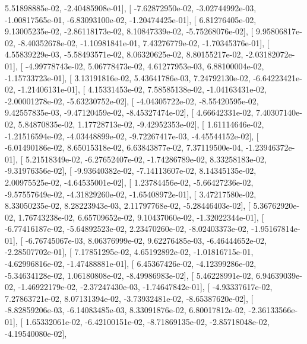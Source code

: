 \documentclass{article}
\begin{document}
          5.51898885e-02,  -2.40485908e-01],
       [ -7.62872950e-02,  -3.02744992e-03,  -1.00817565e-01,
         -6.83093100e-02,  -1.20474425e-01],
       [  6.81276405e-02,   9.13005235e-02,  -2.86118173e-02,
          8.10847339e-02,  -5.75268076e-02],
       [  9.95806817e-02,  -8.40352678e-02,  -1.10981841e-01,
          7.43276779e-02,  -1.70345376e-01],
       [  4.55839229e-03,  -5.58493571e-02,   8.06320625e-02,
          8.80155217e-02,  -2.03182072e-01],
       [ -4.99778743e-02,   5.06778473e-02,   4.61277953e-03,
          6.88100004e-02,  -1.15733723e-01],
       [  3.13191816e-02,   5.43641786e-03,   7.24792130e-02,
         -6.64223421e-02,  -1.21406131e-01],
       [  4.15331453e-02,   7.58585138e-02,  -1.04163431e-02,
         -2.00001278e-02,  -5.63230752e-02],
       [ -4.04305722e-02,  -8.55420595e-02,   9.42557835e-03,
         -9.47120459e-02,  -8.45327474e-02],
       [  4.66642331e-02,   7.40307140e-02,   5.84870835e-02,
          1.17728713e-02,  -9.42952353e-02],
       [  1.61114646e-02,  -1.21516594e-02,  -4.03448899e-02,
         -9.72267417e-03,  -4.45544152e-02],
       [ -6.01490186e-02,   8.65015318e-02,   6.63843877e-02,
          7.37119500e-04,  -1.23946372e-01],
       [  5.21518349e-02,  -6.27652407e-02,  -1.74286789e-02,
          8.33258183e-02,  -9.31976356e-02],
       [ -9.93640382e-02,  -7.14113607e-02,   8.14345135e-02,
          2.00975525e-02,  -4.64535001e-02],
       [  1.23784456e-02,  -5.66427236e-02,  -9.57557649e-02,
         -4.31829260e-02,  -1.65408972e-01],
       [  3.47217580e-02,   8.33050235e-02,   8.28223943e-03,
          2.11797768e-02,  -5.28446403e-02],
       [  5.36762920e-02,   1.76743238e-02,   6.65709652e-02,
          9.10437060e-02,  -1.32022344e-01],
       [ -6.77416187e-02,  -5.64892523e-02,   2.23470260e-02,
         -8.02403373e-02,  -1.95167814e-01],
       [ -6.76745067e-03,   8.06376999e-02,   9.62276485e-03,
         -6.46444652e-02,  -2.28507702e-01],
       [  7.17851295e-02,   4.65192892e-02,  -1.01816715e-01,
         -4.62996816e-02,  -1.47488881e-01],
       [  6.45367426e-02,  -4.12399286e-02,  -5.34634128e-02,
          1.06180808e-02,  -8.49986983e-02],
       [  5.46228991e-02,   6.94639039e-02,  -1.46922179e-02,
         -2.37247430e-03,  -1.74647842e-01],
       [ -4.93337617e-02,   7.27863721e-02,   8.07131394e-02,
         -3.73932481e-02,  -8.65387620e-02],
       [ -8.82859206e-03,  -6.14083485e-03,   8.33091876e-02,
          6.80017812e-02,  -2.36133566e-01],
       [  1.65332061e-02,  -6.42100151e-02,  -8.71869135e-02,
         -2.85718048e-02,  -4.19540080e-02],
\end{document}
